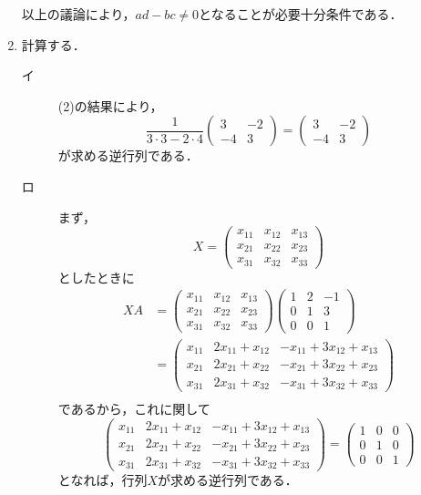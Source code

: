 \documentclass[uplatex,dvipdfmx,a4paper,11pt,fleqn]{jsarticle}
\begin{document}
\begin{leftbar}
\begin{enumerate}
        以上の議論により，$ad - bc \ne 0$となることが必要十分条件である．
        \item 計算する．
    \begin{description}
        \item[イ] (2)の結果により，
        \[
            \frac{1}{3 \cdot 3 - 2 \cdot 4} \begin{pmatrix} 3 & -2 \\ -4 & 3 \end{pmatrix} =  \begin{pmatrix} 3 & -2 \\ -4 & 3 \end{pmatrix}
        \]
        が求める逆行列である．
        \item[ロ] まず，
        \[
            X= \begin{pmatrix} x_{11} & x_{12} & x_{13} \\x_{21} & x_{22} & x_{23} \\x_{31} & x_{32} & x_{33}  \end{pmatrix}
        \]
        としたときに
        \begin{align*} 
           XA &=  \begin{pmatrix} x_{11} & x_{12} & x_{13} \\x_{21} & x_{22} & x_{23} \\x_{31} & x_{32} & x_{33}  \end{pmatrix}
            \begin{pmatrix} 1 & 2 & -1 \\ 0& 1 & 3 \\ 0 & 0 & 1 \end{pmatrix}  \\
            & = \begin{pmatrix} x_{11} & 2x_{11} + x_{12} & -x_{11} +3x_{12} +x_{13} \\ x_{21} & 2x_{21} + x_{22} & -x_{21} +3x_{22} +x_{23} \\  x_{31} & 2x_{31} + x_{32} & -x_{31} +3x_{32} +x_{33} \end{pmatrix} \\
        \end{align*} 
        であるから，これに関して
        \[
            \begin{pmatrix} x_{11} & 2x_{11} + x_{12} & -x_{11} +3x_{12} +x_{13} \\ x_{21} & 2x_{21} + x_{22} & -x_{21} +3x_{22} +x_{23} \\  x_{31} & 2x_{31} + x_{32} & -x_{31} +3x_{32} +x_{33} \end{pmatrix} = \begin{pmatrix} 1 & 0 & 0 \\ 0 & 1 & 0 \\ 0 & 0 & 1 \end{pmatrix}
        \]
        となれば，行列$X$が求める逆行列である．


\end{description}
\end{enumerate}
\end{leftbar}
\end{document}
